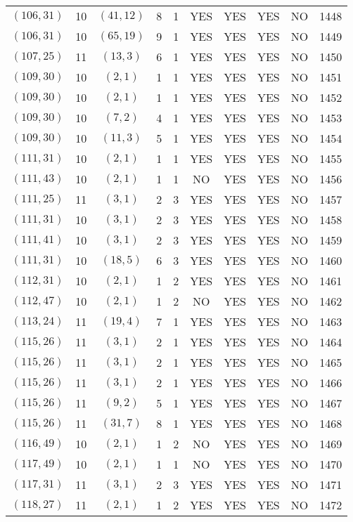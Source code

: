 \begin{longtable}{|c|c|c|c|c|c|c|c|c|c|}
$(106, 31)$ & 10 & $(41, 12)$ & 8 & 1 & YES & YES & YES & NO & 1448\\
$(106, 31)$ & 10 & $(65, 19)$ & 9 & 1 & YES & YES & YES & NO & 1449\\
$(107, 25)$ & 11 & $(13, 3)$ & 6 & 1 & YES & YES & YES & NO & 1450\\
$(109, 30)$ & 10 & $(2, 1)$ & 1 & 1 & YES & YES & YES & NO & 1451\\
$(109, 30)$ & 10 & $(2, 1)$ & 1 & 1 & YES & YES & YES & NO & 1452\\
$(109, 30)$ & 10 & $(7, 2)$ & 4 & 1 & YES & YES & YES & NO & 1453\\
$(109, 30)$ & 10 & $(11, 3)$ & 5 & 1 & YES & YES & YES & NO & 1454\\
$(111, 31)$ & 10 & $(2, 1)$ & 1 & 1 & YES & YES & YES & NO & 1455\\
$(111, 43)$ & 10 & $(2, 1)$ & 1 & 1 & NO & YES & YES & NO & 1456\\
$(111, 25)$ & 11 & $(3, 1)$ & 2 & 3 & YES & YES & YES & NO & 1457\\
$(111, 31)$ & 10 & $(3, 1)$ & 2 & 3 & YES & YES & YES & NO & 1458\\
$(111, 41)$ & 10 & $(3, 1)$ & 2 & 3 & YES & YES & YES & NO & 1459\\
$(111, 31)$ & 10 & $(18, 5)$ & 6 & 3 & YES & YES & YES & NO & 1460\\
$(112, 31)$ & 10 & $(2, 1)$ & 1 & 2 & YES & YES & YES & NO & 1461\\
$(112, 47)$ & 10 & $(2, 1)$ & 1 & 2 & NO & YES & YES & NO & 1462\\
$(113, 24)$ & 11 & $(19, 4)$ & 7 & 1 & YES & YES & YES & NO & 1463\\
$(115, 26)$ & 11 & $(3, 1)$ & 2 & 1 & YES & YES & YES & NO & 1464\\
$(115, 26)$ & 11 & $(3, 1)$ & 2 & 1 & YES & YES & YES & NO & 1465\\
$(115, 26)$ & 11 & $(3, 1)$ & 2 & 1 & YES & YES & YES & NO & 1466\\
$(115, 26)$ & 11 & $(9, 2)$ & 5 & 1 & YES & YES & YES & NO & 1467\\
$(115, 26)$ & 11 & $(31, 7)$ & 8 & 1 & YES & YES & YES & NO & 1468\\
$(116, 49)$ & 10 & $(2, 1)$ & 1 & 2 & NO & YES & YES & NO & 1469\\
$(117, 49)$ & 10 & $(2, 1)$ & 1 & 1 & NO & YES & YES & NO & 1470\\
$(117, 31)$ & 11 & $(3, 1)$ & 2 & 3 & YES & YES & YES & NO & 1471\\
$(118, 27)$ & 11 & $(2, 1)$ & 1 & 2 & YES & YES & YES & NO & 1472\\

\end{longtable}
